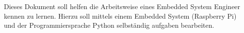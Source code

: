 Dieses Dokument soll \Studi helfen die Arbeitsweise eines Embedded System Engineer kennen zu lernen. 
Hierzu soll \Studi mittels einem Embedded System (Raspberry Pi) und der Programmiersprache Python selbständig aufgaben bearbeiten.